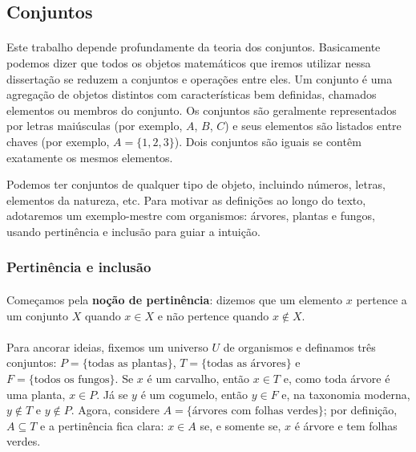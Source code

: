 \documentclass[12pt,a4paper]{article}
\begin{document}
\subsection{Conjuntos}
\paragraph{}

Este trabalho depende profundamente da teoria dos conjuntos.
Basicamente podemos dizer que todos os objetos matemáticos que iremos utilizar nessa dissertação se reduzem a conjuntos e operações entre eles.
Um conjunto é uma agregação de objetos distintos com características bem definidas, chamados elementos ou membros do conjunto. Os conjuntos são geralmente representados por letras maiúsculas (por exemplo, \(A\), \(B\), \(C\)) e seus elementos são listados entre chaves (por exemplo, \(A = \{1, 2, 3\}\)). Dois conjuntos são iguais se contêm exatamente os mesmos elementos.

Podemos ter conjuntos de qualquer tipo de objeto, incluindo números, letras, elementos da natureza, etc. Para motivar as definições ao longo do texto, adotaremos um exemplo-mestre com organismos: árvores, plantas e fungos, usando pertinência e inclusão para guiar a intuição.

\subsubsection{Pertinência e inclusão}
\paragraph{}
Começamos pela \textbf{noção de pertinência}: dizemos que um elemento \(x\) pertence a um conjunto \(X\) quando \(x \in X\) e não pertence quando \(x \notin X\).

\paragraph{}
Para ancorar ideias, fixemos um universo \(U\) de organismos e definamos três conjuntos: \(P=\{\text{todas as plantas}\}\), \(T=\{\text{todas as árvores}\}\) e \(F=\{\text{todos os fungos}\}\). Se \(x\) é um carvalho, então \(x\in T\) e, como toda árvore é uma planta, \(x\in P\). Já se \(y\) é um cogumelo, então \(y\in F\) e, na taxonomia moderna, \(y\notin T\) e \(y\notin P\). Agora, considere \(A=\{\text{árvores com folhas verdes}\}\); por definição, \(A\subseteq T\) e a pertinência fica clara: \(x\in A\) se, e somente se, \(x\) é árvore e tem folhas verdes.
\end{document}
